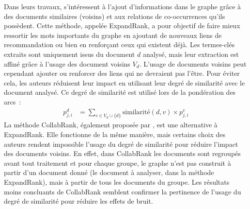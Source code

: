           Dans leurs travaux, \citet{wan2008expandrank} s'intéressent à l'ajout
          d'informations dans le graphe grâce à des documents similaires
          (voisins) et aux relations de co-occurrences qu'ils possèdent. Cette
          méthode, appelée ExpandRank, a pour objectif de faire mieux ressortir
          les mots importants du graphe en ajoutant de nouveaux liens de
          recommandation ou bien en renforçant ceux qui existent déjà. Les
          termes-clés extraits sont uniquement issus du document $d$ analysé,
          mais leur extraction est affiné grâce à l'usage des document voisins
          $V_d$. L'usage de documents voisins peut cependant ajouter ou
          renforcer des liens qui ne devraient pas l'être. Pour éviter cela, les
          auteurs réduisent leur impact en utilisant leur degré de similarité
          avec le document analysé. Ce degré de similarité est utilisé lors de
          la pondération des arcs~:
          \begin{align}
            p_{j, i}^d &= \sum_{v \in V_d \cup \{d\}} \text{similarité}(d, v) \times p_{j, i}^v
          \end{align}
          La méthode CollabRank, également proposée par
          \citet{wan2008collabrank}, est une alternative à ExpandRank. Elle
          fonctionne de la même manière, mais certains choix des auteurs rendent
          impossible l'usage du degré de similarité pour réduire l'impact des
          documents voisins. En effet, dans CollabRank les documents sont
          regroupés avant tout traitement et pour chaque groupe, le graphe n'est
          pas construit à partir d'un document donné (le document à analyser,
          dans la méthode ExpandRank), mais à partir de tous les documents du
          groupe. Les résultats moins concluants de CollabRank semblent
          confirmer la pertinence de l'usage du degré de similarité pour réduire
          les effets de bruit.

